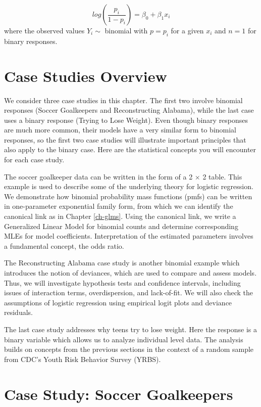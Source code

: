 \documentclass[
]{krantz}
\begin{document}
\begin{equation*}
log(\frac{p_i}{1-p_i})=\beta_0+\beta_1 x_i
\end{equation*}
where the observed values \(Y_i \sim\) binomial with \(p=p_i\) for a given \(x_i\) and \(n=1\) for binary responses.

\hypertarget{case-studies-overview-1}{%
\section{Case Studies Overview}\label{case-studies-overview-1}}

We consider three case studies in this chapter. The first two involve binomial responses (Soccer Goalkeepers and Reconstructing Alabama), while the last case uses a binary response (Trying to Lose Weight). Even though binary responses are much more common, their models have a very similar form to binomial responses, so the first two case studies will illustrate important principles that also apply to the binary case. Here are the statistical concepts you will encounter for each case study.

The soccer goalkeeper data can be written in the form of a 2 \(\times\) 2 table. This example is used to describe some of the underlying theory for logistic regression. We demonstrate how binomial probability mass functions (pmfs) can be written in one-parameter exponential family form, from which we can identify the canonical link as in Chapter \ref{ch-glms}. Using the canonical link, we write a Generalized Linear Model for binomial counts and determine corresponding MLEs for model coefficients. Interpretation of the estimated parameters involves a fundamental concept, the odds ratio.

The Reconstructing Alabama case study is another binomial example which introduces the notion of deviances, which are used to compare and assess models. Thus, we will investigate hypothesis tests and confidence intervals, including issues of interaction terms, overdispersion, and lack-of-fit. We will also check the assumptions of logistic regression using empirical logit plots and deviance residuals.

The last case study addresses why teens try to lose weight. Here the response is a binary variable which allows us to analyze individual level data. The analysis builds on concepts from the previous sections in the context of a random sample from CDC's Youth Risk Behavior Survey (YRBS).

\hypertarget{case-study-soccer-goalkeepers}{%
\section{Case Study: Soccer Goalkeepers}\label{case-study-soccer-goalkeepers}}
\end{document}
